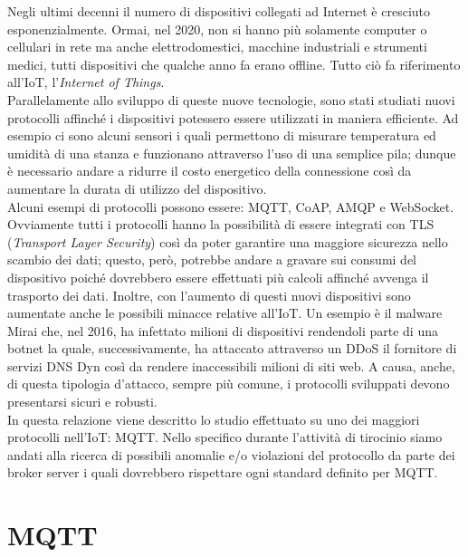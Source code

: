 \documentclass[Lau,binding=0.6cm,noexaminfo=true]{sapthesis}
\begin{document}
\begin{large}
Negli ultimi decenni il numero di dispositivi collegati ad Internet è cresciuto esponenzialmente. Ormai, nel 2020, non si hanno più solamente computer o cellulari in rete ma anche elettrodomestici, macchine industriali e strumenti medici, tutti dispositivi che qualche anno fa erano offline. Tutto ciò fa riferimento all'IoT, l'\textit{Internet of Things}. \\
Parallelamente allo sviluppo di queste nuove tecnologie, sono stati studiati nuovi protocolli affinché i dispositivi potessero essere utilizzati in maniera efficiente. Ad esempio ci sono alcuni sensori i quali permettono di misurare temperatura ed umidità di una stanza e funzionano attraverso l'uso di una semplice pila; dunque è necessario andare a ridurre il costo energetico della connessione così da aumentare la durata di utilizzo del dispositivo. \\
Alcuni esempi di protocolli possono essere: MQTT, CoAP, AMQP e WebSocket. Ovviamente tutti i protocolli hanno la possibilità di essere integrati con TLS (\textit{Transport Layer Security}) così da poter garantire una maggiore sicurezza nello scambio dei dati; questo, però, potrebbe andare a gravare sui consumi del dispositivo poiché dovrebbero essere effettuati più calcoli affinché avvenga il trasporto dei dati. Inoltre, con l'aumento di questi nuovi dispositivi sono aumentate anche le possibili minacce relative all'IoT. Un esempio è il malware Mirai che, nel 2016, ha infettato milioni di dispositivi rendendoli parte di una botnet la quale, successivamente, ha attaccato attraverso un DDoS il fornitore di servizi DNS Dyn così da rendere inaccessibili milioni di siti web. A causa, anche, di questa tipologia d'attacco, sempre più comune, i protocolli sviluppati devono presentarsi sicuri e robusti.\\

In questa relazione viene descritto lo studio effettuato su uno dei maggiori protocolli nell'IoT: MQTT. Nello specifico durante l'attività di tirocinio siamo andati alla ricerca di possibili anomalie e/o violazioni del protocollo da parte dei broker server i quali dovrebbero rispettare ogni standard definito per MQTT.

\end{large}


\chapter{MQTT}
\end{document}
